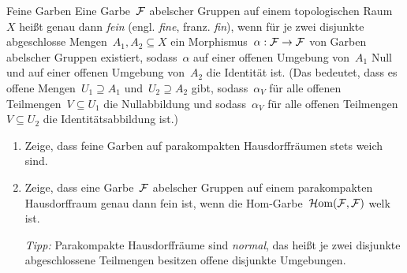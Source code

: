\documentclass{uebblatt}
\begin{document}
\begin{aufgabe}{Feine Garben}
Eine Garbe~$\mathcal{F}$ abelscher Gruppen auf einem topologischen Raum~$X$ heißt genau dann \emph{fein}
(engl. \emph{fine}, franz. \emph{fin}), wenn für je zwei disjunkte abgeschlosse
Mengen~$A_1, A_2 \subseteq X$ ein Morphismus~$\alpha : \mathcal{F} \to \mathcal{F}$ von Garben
abelscher Gruppen existiert, sodass~$\alpha$ auf einer offenen Umgebung
von~$A_1$ Null und auf einer offenen Umgebung von~$A_2$ die Identität ist.
(Das bedeutet, dass es offene Mengen~$U_1 \supseteq A_1$
und~$U_2 \supseteq A_2$ gibt, sodass~$\alpha_V$ für alle offenen Teilmengen~$V
\subseteq U_1$ die Nullabbildung und sodass~$\alpha_V$ für alle offenen
Teilmengen~$V \subseteq U_2$ die Identitätsabbildung ist.)

\begin{enumerate}
\item Zeige, dass feine Garben auf parakompakten Hausdorffräumen stets weich
sind.
\item Zeige, dass eine Garbe~$\mathcal{F}$ abelscher Gruppen auf einem parakompakten
Hausdorffraum genau dann fein ist, wenn die Hom-Garbe~$\mathcal{H}\mathrm{om}(\mathcal{F},\mathcal{F})$ welk ist.

\emph{Tipp:} Parakompakte Hausdorffräume sind \emph{normal}, das heißt
je zwei disjunkte abgeschlossene Teilmengen besitzen offene disjunkte
Umgebungen.
\end{enumerate}
\end{aufgabe}
\end{document}

